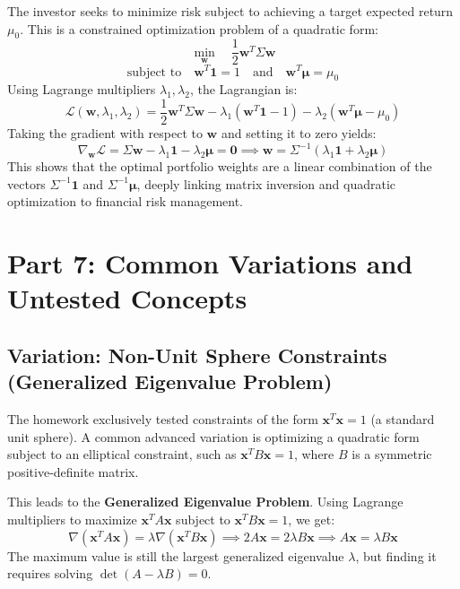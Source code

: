 \documentclass[11pt, letterpaper]{article}
\theoremstyle{definition}
\theoremstyle{remark}
\begin{document}
The investor seeks to minimize risk subject to achieving a target expected return $\mu_0$. This is a constrained optimization problem of a quadratic form:
\[ \min_{\mathbf{w}} \quad \frac{1}{2} \mathbf{w}^T \Sigma \mathbf{w} \]
\[ \text{subject to} \quad \mathbf{w}^T \mathbf{1} = 1 \quad \text{and} \quad \mathbf{w}^T \boldsymbol{\mu} = \mu_0 \]
Using Lagrange multipliers $\lambda_1, \lambda_2$, the Lagrangian is:
\[ \mathcal{L}(\mathbf{w}, \lambda_1, \lambda_2) = \frac{1}{2} \mathbf{w}^T \Sigma \mathbf{w} - \lambda_1 (\mathbf{w}^T \mathbf{1} - 1) - \lambda_2 (\mathbf{w}^T \boldsymbol{\mu} - \mu_0) \]
Taking the gradient with respect to $\mathbf{w}$ and setting it to zero yields:
\[ \nabla_{\mathbf{w}} \mathcal{L} = \Sigma \mathbf{w} - \lambda_1 \mathbf{1} - \lambda_2 \boldsymbol{\mu} = \mathbf{0} \implies \mathbf{w} = \Sigma^{-1} (\lambda_1 \mathbf{1} + \lambda_2 \boldsymbol{\mu}) \]
This shows that the optimal portfolio weights are a linear combination of the vectors $\Sigma^{-1}\mathbf{1}$ and $\Sigma^{-1}\boldsymbol{\mu}$, deeply linking matrix inversion and quadratic optimization to financial risk management.

\newpage

\section{Part 7: Common Variations and Untested Concepts}

\subsection{Variation: Non-Unit Sphere Constraints (Generalized Eigenvalue Problem)}
The homework exclusively tested constraints of the form $\mathbf{x}^T\mathbf{x} = 1$ (a standard unit sphere). A common advanced variation is optimizing a quadratic form subject to an elliptical constraint, such as $\mathbf{x}^T B \mathbf{x} = 1$, where $B$ is a symmetric positive-definite matrix.

This leads to the \textbf{Generalized Eigenvalue Problem}. Using Lagrange multipliers to maximize $\mathbf{x}^T A \mathbf{x}$ subject to $\mathbf{x}^T B \mathbf{x} = 1$, we get:
\[ \nabla(\mathbf{x}^T A \mathbf{x}) = \lambda \nabla(\mathbf{x}^T B \mathbf{x}) \implies 2A\mathbf{x} = 2\lambda B\mathbf{x} \implies A\mathbf{x} = \lambda B\mathbf{x} \]
The maximum value is still the largest generalized eigenvalue $\lambda$, but finding it requires solving $\det(A - \lambda B) = 0$.
\end{document}
